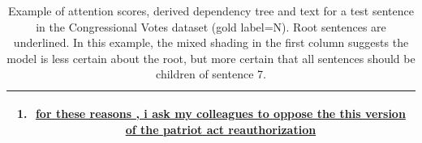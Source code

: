 \begin{table}[h!]
\begin{center}
\begin{tabular}{c}
{\begin{enumerate}[topsep=-5pt, noitemsep,leftmargin=*]
      \item \uline{for these reasons , i ask my colleagues to oppose the this version of the patriot act reauthorization} 
      \end{enumerate}}\\
      \bottomrule
      \end{tabular}
      \caption{Example of attention scores, derived dependency tree and text for a test sentence in the Congressional Votes dataset (gold label=N). Root sentences are underlined. In this example, the mixed shading in the first column suggests the model is less certain about the root, but more certain that all sentences should be children of sentence 7.}
      \label{tab:latent_votes}
      \end{center}
      \end{table}
      
